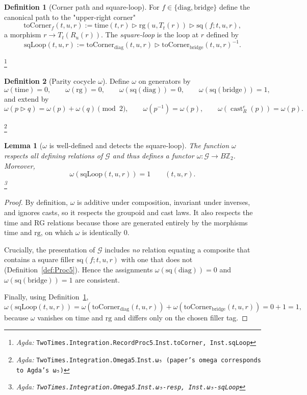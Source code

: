 \documentclass{article}
\newcommand{\castR}[2]{\operatorname{cast}_R^{#1}\!\left(#2\right)}
\newcommand{\Ztwo}{\mathbb{Z}_2}
\newcommand{\Agda}[1]{\texttt{#1}}
\newcommand{\AgdaRef}[2]{\emph{Agda: }\Agda{#1}.\Agda{#2}}
\newcommand{\AgdaNote}[2]{\footnote{\AgdaRef{#1}{#2}}}
\theoremstyle{definition}
\newtheorem{definition}{Definition}[section]
\theoremstyle{plain}
\newtheorem{lemma}{Lemma}[section]
\begin{document}
\begin{definition}[Corner path and square-loop]
\label{def:sqloop}
For $f\in\{\mathrm{diag},\mathrm{bridge}\}$ define the canonical path to the
"upper-right corner"
\[
  \mathrm{toCorner}_f(t,u,r)
  :=\mathrm{time}(t,r)\triangleright\mathrm{rg}(u,T_t(r))\triangleright\mathrm{sq}(f;t,u,r),
\]
a morphism $r\to T_t(R_u(r))$.
The \emph{square-loop} is the loop at $r$ defined by
\[
  \mathrm{sqLoop}(t,u,r):=\mathrm{toCorner}_{\mathrm{diag}}(t,u,r)\triangleright
  \mathrm{toCorner}_{\mathrm{bridge}}(t,u,r)^{-1}.
\]
\end{definition}
\AgdaNote{TwoTimes.Integration.RecordProc5}{Inst.toCorner, Inst.sqLoop}

\begin{definition}[Parity cocycle $\omega$]
\label{def:limited-scope-theorem-translation-003}
Define $\omega$ on generators by
\[\omega(\mathrm{time})=0,\qquad \omega(\mathrm{rg})=0,\qquad
\omega(\mathrm{sq}(\mathrm{diag}))=0,\qquad \omega(\mathrm{sq}(\mathrm{bridge}))=1,\]
and extend by
\[
\omega(p\triangleright q)=\omega(p)+\omega(q)\pmod 2,\qquad
\omega(p^{-1})=\omega(p),\qquad
\omega(\castR{e}{p})=\omega(p).
\]
\end{definition}
\AgdaNote{TwoTimes.Integration.Omega5}{Inst.ω₅ (paper's omega corresponds to Agda's ω₅)}

\begin{lemma}[$\omega$ is well-defined and detects the square-loop]
\label{lem:omega}
The function $\omega$ respects all defining relations of $\mathcal G$ and thus
defines a functor $\omega:\mathcal G\to B\Ztwo$. Moreover,
\[\omega(\mathrm{sqLoop}(t,u,r))=1\qquad (t,u,r).\]
\AgdaNote{TwoTimes.Integration.Omega5}{Inst.ω₅-resp, Inst.ω₅-sqLoop}
\end{lemma}

\begin{proof}
By definition, $\omega$ is additive under composition, invariant under inverses,
and ignores casts, so it respects the groupoid and cast laws. It also respects the
time and RG relations because those are generated entirely by the morphisms
$\mathrm{time}$ and $\mathrm{rg}$, on which $\omega$ is identically $0$.

Crucially, the presentation of $\mathcal G$ includes \emph{no} relation equating a
composite that contains a square filler $\mathrm{sq}(f;t,u,r)$ with one that does
not (Definition~\ref{def:Proc5}). Hence the assignments
$\omega(\mathrm{sq}(\mathrm{diag}))=0$ and $\omega(\mathrm{sq}(\mathrm{bridge}))=1$ are
consistent.

Finally, using Definition~\ref{def:sqloop},
\[
\omega(\mathrm{sqLoop}(t,u,r))
=\omega(\mathrm{toCorner}_{\mathrm{diag}}(t,u,r))
+\omega(\mathrm{toCorner}_{\mathrm{bridge}}(t,u,r))
=0+1=1,
\]
because $\omega$ vanishes on $\mathrm{time}$ and $\mathrm{rg}$ and differs only on the
chosen filler tag.
\end{proof}
\end{document}
